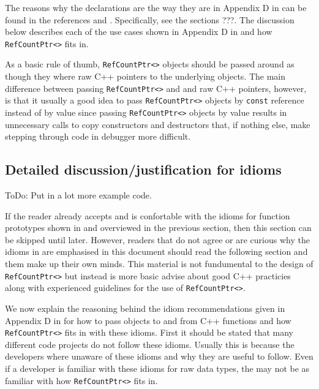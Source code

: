 The reasons why the declarations are the way they are in Appendix D in
{}\cite{ref:RefCountPtrBeginnersGuide} can be found in the references
{}\cite{ref:stroustrup_2000} and {}\cite{ref:meyers_1994}.
Specifically, see the sections ???.  The discussion below describes
each of the use cases shown in Appendix D in
{}\cite{ref:RefCountPtrBeginnersGuide} and how
{}\texttt{Ref\-Count\-Ptr<>} fits in.

As a basic rule of thumb, {}\texttt{Ref\-Count\-Ptr<>} objects should
be passed around as though they where raw C++ pointers to the
underlying objects.  The main difference between passing
{}\texttt{Ref\-Count\-Ptr<>} and and raw C++ pointers, however, is
that it usually a good idea to pass {}\texttt{Ref\-Count\-Ptr<>}
objects by {}\texttt{const} reference instead of by value since
passing {}\texttt{Ref\-Count\-Ptr<>} objects by value results in
unnecessary calls to copy constructors and destructors that, if
nothing else, make stepping through code in debugger more difficult.

%
\subsection{Detailed discussion/justification for idioms}
%

ToDo: Put in a lot more example code.

If the reader already accepts and is confortable with the idioms for
function prototypes shown in {}\cite[Appendix
D]{ref:RefCountPtrBeginnersGuide} and overviewed in the previous
section, then this section can be skipped until later.  However,
readers that do not agree or are curious why the idioms in
{}\cite[Appendix D]{ref:RefCountPtrBeginnersGuide} are emphasised in
this document should read the following section and them make up their
own minds.  This material is not fundumental to the design of
{}\texttt{Ref\-Count\-Ptr<>} but instead is more basic advise about
good C++ practicies along with experienced guidelines for the use of
{}\texttt{Ref\-Count\-Ptr<>}.

We now explain the reasoning behind the idiom recommendations given in
Appendix D in {}\cite{ref:RefCountPtrBeginnersGuide} for how to pass
objects to and from C++ functions and how {}\texttt{Ref\-Count\-Ptr<>}
fits in with these idioms.  First it should be stated that many
different code projects do not follow these idioms.  Usually this is
because the developers where unaware of these idioms and why they are
useful to follow.  Even if a developer is familiar with these idioms
for raw data types, the may not be as familiar with how
{}\texttt{Ref\-Count\-Ptr<>} fits in.

